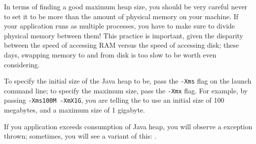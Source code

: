 In terms of finding a good maximum heap size, you should be very careful never
to set it to be more than the amount of physical memory on your machine. If your
application runs as multiple processes, you have to make sure to divide physical
memory between them! This practice is important, given the disparity between the
speed of accessing RAM versus the speed of accessing disk; these days, swapping
memory to and from disk is too slow to be worth even considering.


To specify the initial size of the Java heap to be, pass the {\tt -Xms} flag on
the launch command line; to specify the maximum size, pass the {\tt -Xmx} flag.
For example, by passing {\tt -Xms100M -XmX1G}, you are telling the \jre to use
an initial size of 100 megabytes, and a maximum size of 1 gigabyte.

If you application exceeds consumption of Java heap, you will observe a
 exception
thrown; sometimes, you will see a variant of
this: .










